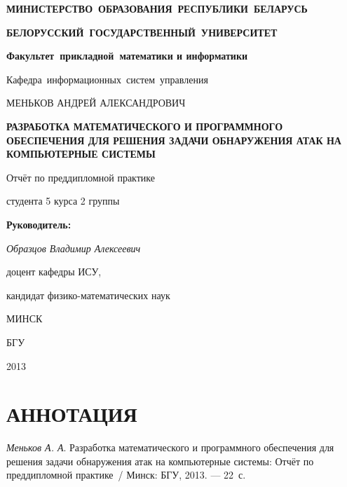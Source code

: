 \titlepage
\begin{center}
	\begin{large}
		\textbf{МИНИСТЕРСТВО~ОБРАЗОВАНИЯ~РЕСПУБЛИКИ~БЕЛАРУСЬ}
		
		\smallskip
		\textbf{БЕЛОРУССКИЙ~ГОСУДАРСТВЕННЫЙ~УНИВЕРСИТЕТ}
		
		\smallskip
		\textbf{Факультет~прикладной~математики и информатики}
		
		\smallskip
		Кафедра~информационных~систем~управления
	\end{large}
\end{center}

\vfill

\begin{center}
	\large {МЕНЬКОВ АНДРЕЙ АЛЕКСАНДРОВИЧ}
	
	\bigskip	
	{\Large \textbf{РАЗРАБОТКА МАТЕМАТИЧЕСКОГО И ПРОГРАММНОГО ОБЕСПЕЧЕНИЯ ДЛЯ РЕШЕНИЯ ЗАДАЧИ ОБНАРУЖЕНИЯ АТАК НА КОМПЬЮТЕРНЫЕ СИСТЕМЫ}}
	
	\bigskip
	Отчёт по преддипломной практике
	
	студента 5 курса 2 группы
\end{center}


\vfill
\begin{flushright}
	\begin{minipage}{7cm}
		\textbf{Руководитель:}
		
		\textit{Образцов Владимир Алексеевич}
		
		доцент кафедры ИСУ,
		
		кандидат физико-математических наук 
	\end{minipage}
\end{flushright}

\vfill

\begin{center}
	МИНСК
	
	БГУ
	
	2013
\end{center}

\newpage

\newcommand{\pagescount}{22}
\section*{АННОТАЦИЯ}

\textit{Меньков А. А}. Разработка математического и программного обеспечения для решения задачи обнаружения атак на компьютерные системы:
Отчёт по преддипломной практике~/ Минск: 
БГУ, 2013. --- \pagescount~с.

